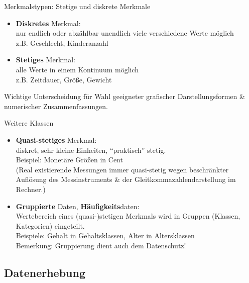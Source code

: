 \documentclass[
  10pt,
  ignorenonframetext,
]{beamer}
\providecommand{\tightlist}{%
  \setlength{\itemsep}{0pt}\setlength{\parskip}{0pt}}
\begin{document}
\begin{frame}{Merkmalstypen: Stetige und diskrete Merkmale}
\protect\hypertarget{merkmalstypen-stetige-und-diskrete-merkmale}{}
\begin{itemize}
\tightlist
\item
  \textbf{Diskretes} Merkmal:\\
  nur endlich oder abzählbar unendlich viele verschiedene Werte
  möglich\\
  z.B. Geschlecht, Kinderanzahl
\item
  \textbf{Stetiges} Merkmal:\\
  alle Werte in einem Kontinuum möglich\\
  z.B. Zeitdauer, Größe, Gewicht
\end{itemize}

Wichtige Unterscheidung für Wahl geeigneter grafischer
Darstellungsformen \& numerischer Zusammenfassungen.
\end{frame}

\begin{frame}{Weitere Klassen}
\protect\hypertarget{weitere-klassen}{}
\begin{itemize}
\tightlist
\item
  \textbf{Quasi-stetiges} Merkmal:\\
  diskret, sehr kleine Einheiten, ``praktisch'' stetig.\\
  Beispiel: Monetäre Größen in Cent\\
  (Real existierende Messungen immer quasi-stetig wegen beschränkter
  Auflösung des Messinstruments \& der Gleitkommazahlendarstellung im
  Rechner.)
\item
  \textbf{Gruppierte} Daten, \textbf{Häufigkeits}daten:\\
  Wertebereich eines (quasi-)stetigen Merkmals wird in Gruppen (Klassen,
  Kategorien) eingeteilt.\\
  Beispiele: Gehalt in Gehaltsklassen, Alter in Altersklassen\\
  Bemerkung: Gruppierung dient auch dem Datenschutz!
\end{itemize}
\end{frame}

\hypertarget{datenerhebung}{%
\subsection{Datenerhebung}\label{datenerhebung}}
\end{document}
